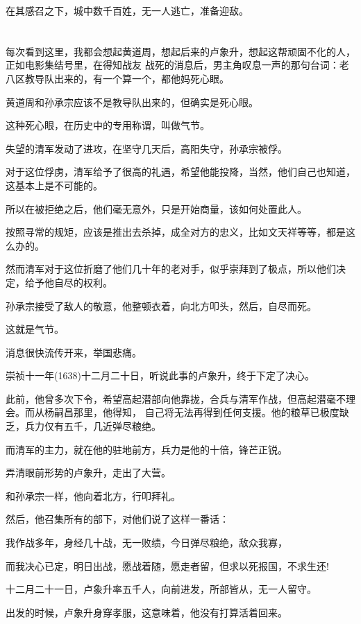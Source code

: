 \documentclass[11pt,a4paper,onecolumn]{article}
\begin{document}
在其感召之下，城中数千百姓，无一人逃亡，准备迎敌。

\section[\thesection]{}

每次看到这里，我都会想起黄道周，想起后来的卢象升，想起这帮顽固不化的人，正如电影集结号里，在得知战友
战死的消息后，男主角叹息一声的那句台词：老八区教导队出来的，有一个算一个，都他妈死心眼。

黄道周和孙承宗应该不是教导队出来的，但确实是死心眼。

这种死心眼，在历史中的专用称谓，叫做\myrule 气节。

失望的清军发动了进攻，在坚守几天后，高阳失守，孙承宗被俘。

对于这位俘虏，清军给予了很高的礼遇，希望他能投降，当然，他们自己也知道，这基本上是不可能的。

所以在被拒绝之后，他们毫无意外，只是开始商量，该如何处置此人。

按照寻常的规矩，应该是推出去杀掉，成全对方的忠义，比如文天祥等等，都是这么办的。

然而清军对于这位折磨了他们几十年的老对手，似乎崇拜到了极点，所以他们决定，给予他自尽的权利。

孙承宗接受了敌人的敬意，他整顿衣着，向北方叩头，然后，自尽而死。

这就是气节。

消息很快流传开来，举国悲痛。

崇祯十一年(1638)十二月二十日，听说此事的卢象升，终于下定了决心。

此前，他曾多次下令，希望高起潜部向他靠拢，合兵与清军作战，但高起潜毫不理会。而从杨嗣昌那里，他得知，
自己将无法再得到任何支援。他的粮草已极度缺乏，兵力仅有五千，几近弹尽粮绝。

而清军的主力，就在他的驻地前方，兵力是他的十倍，锋芒正锐。

弄清眼前形势的卢象升，走出了大营。

和孙承宗一样，他向着北方，行叩拜礼。

然后，他召集所有的部下，对他们说了这样一番话：

我作战多年，身经几十战，无一败绩，今日弹尽粮绝，敌众我寡，

而我决心已定，明日出战，愿战着随，愿走者留，但求以死报国，不求生还!

十二月二十一日，卢象升率五千人，向前进发，所部皆从，无一人留守。

出发的时候，卢象升身穿孝服，这意味着，他没有打算活着回来。
\end{document}
